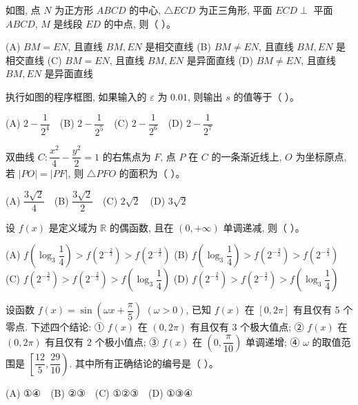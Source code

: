 \begin{question}
如图, 点 $N$ 为正方形 $ABCD$ 的中心, $\triangle ECD$ 为正三角形, 平面 $ECD \perp$ 平面 $ABCD$, $M$ 是线段 $ED$ 的中点, 则（ ）。
\nopagebreak[4]
\begin{center}\end{center}
\nopagebreak[4]
(A) $BM = EN$, 且直线 $BM, EN$ 是相交直线  
(B) $BM \neq EN$, 且直线 $BM, EN$ 是相交直线  
(C) $BM = EN$, 且直线 $BM, EN$ 是异面直线  
(D) $BM \neq EN$, 且直线 $BM, EN$ 是异面直线

\Needspace{0.4\textheight}
\end{question}
\begin{question}
执行如图的程序框图, 如果输入的 $\varepsilon$ 为 $0.01$, 则输出 $s$ 的值等于（ ）。
\nopagebreak[4]
\begin{center}\end{center}
\nopagebreak[4]
(A) $2 - \dfrac{1}{2^4}$　(B) $2 - \dfrac{1}{2^5}$　(C) $2 - \dfrac{1}{2^6}$　(D) $2 - \dfrac{1}{2^7}$

\end{question}
\begin{question}
双曲线 $C: \dfrac{x^2}{4} - \dfrac{y^2}{2} = 1$ 的右焦点为 $F$, 点 $P$ 在 $C$ 的一条渐近线上, $O$ 为坐标原点, 若 $|PO| = |PF|$, 则 $\triangle PFO$ 的面积为（ ）。

(A) $\dfrac{3\sqrt{2}}{4}$　(B) $\dfrac{3\sqrt{2}}{2}$　(C) $2\sqrt{2}$　(D) $3\sqrt{2}$

\end{question}
\begin{question}
设 $f(x)$ 是定义域为 $\mathbb{R}$ 的偶函数, 且在 $(0, +\infty)$ 单调递减, 则（ ）。

(A) $f\left(\log_3 \dfrac{1}{4}\right) > f\left(2^{-\frac{2}{3}}\right) > f\left(2^{-\frac{3}{2}}\right)$  
(B) $f\left(\log_3 \dfrac{1}{4}\right) > f\left(2^{-\frac{3}{2}}\right) > f\left(2^{-\frac{2}{3}}\right)$  
(C) $f\left(2^{-\frac{3}{2}}\right) > f\left(2^{-\frac{2}{3}}\right) > f\left(\log_3 \dfrac{1}{4}\right)$  
(D) $f\left(2^{-\frac{2}{3}}\right) > f\left(2^{-\frac{3}{2}}\right) > f\left(\log_3 \dfrac{1}{4}\right)$

\end{question}
\begin{question}
设函数 $f(x) = \sin\left(\omega x + \dfrac{\pi}{5}\right)$ $(\omega > 0)$, 已知 $f(x)$ 在 $[0, 2\pi]$ 有且仅有 5 个零点. 下述四个结论:  
① $f(x)$ 在 $(0, 2\pi)$ 有且仅有 3 个极大值点;  
② $f(x)$ 在 $(0, 2\pi)$ 有且仅有 2 个极小值点;  
③ $f(x)$ 在 $\left(0, \dfrac{\pi}{10}\right)$ 单调递增;  
④ $\omega$ 的取值范围是 $\left[\dfrac{12}{5}, \dfrac{29}{10}\right)$.  
其中所有正确结论的编号是（ ）。

(A) ①④　(B) ②③　(C) ①②③　(D) ①③④

\par\medskip

\end{question}

